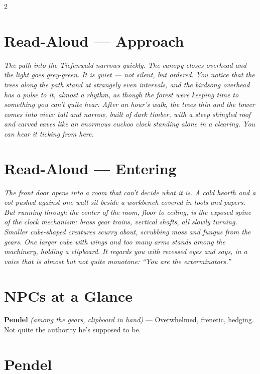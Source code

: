 \documentclass[10pt,letterpaper]{article}
\newcommand{\npc}[3]{\textbf{#1} \textit{(#2)} --- #3}
\begin{document}
\begin{multicols}{2}

\section*{Read-Aloud --- Approach}
\begin{readaloud}
\itshape
The path into the Tiefenwald narrows quickly. The canopy closes overhead and the light goes grey-green. It is quiet --- not silent, but ordered. You notice that the trees along the path stand at strangely even intervals, and the birdsong overhead has a pulse to it, almost a rhythm, as though the forest were keeping time to something you can't quite hear. After an hour's walk, the trees thin and the tower comes into view: tall and narrow, built of dark timber, with a steep shingled roof and carved eaves like an enormous cuckoo clock standing alone in a clearing. You can hear it ticking from here.
\end{readaloud}

\section*{Read-Aloud --- Entering}
\begin{readaloud}
\itshape
The front door opens into a room that can't decide what it is. A cold hearth and a cot pushed against one wall sit beside a workbench covered in tools and papers. But running through the center of the room, floor to ceiling, is the exposed spine of the clock mechanism: brass gear trains, vertical shafts, all slowly turning. Smaller cube-shaped creatures scurry about, scrubbing moss and fungus from the gears. One larger cube with wings and too many arms stands among the machinery, holding a clipboard. It regards you with recessed eyes and says, in a voice that is almost but not quite monotone: ``You are the exterminators.''
\end{readaloud}

\section*{NPCs at a Glance}

\npc{Pendel}{among the gears, clipboard in hand}{Overwhelmed, frenetic, hedging. Not quite the authority he's supposed to be.}

\section*{Pendel}

\end{multicols}
\end{document}
